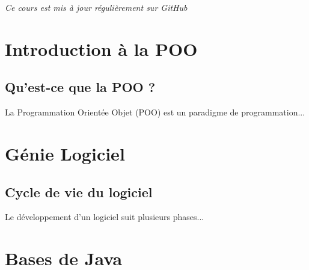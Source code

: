 \vspace{1cm}

\begin{center}
    \textit{Ce cours est mis \`a jour régulièrement sur GitHub}
\end{center}

\newpage


\tableofcontents
\newpage


\section{Introduction à la POO}
\label{sec:introduction}

\subsection{Qu'est-ce que la POO ?}

La Programmation Orientée Objet (POO) est un paradigme de programmation...



\section{Génie Logiciel}
\label{sec:genie-logiciel}

\subsection{Cycle de vie du logiciel}

Le développement d'un logiciel suit plusieurs phases...



\section{Bases de Java}
\label{sec:bases-java}

